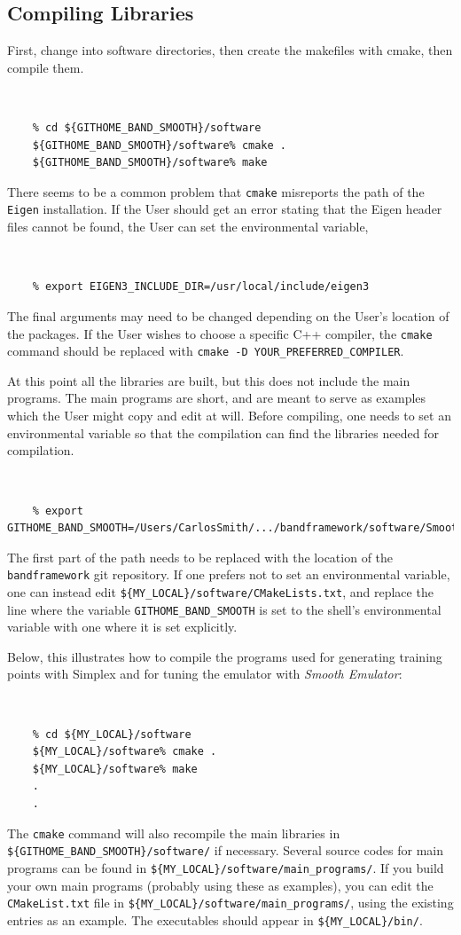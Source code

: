 \documentclass[UserManual.tex]{subfiles}
\begin{document}
\subsection{Compiling Libraries }

First, change into software directories, then create the makefiles with cmake, then compile them.
{\tt 
\begin{verbatim}
    % cd ${GITHOME_BAND_SMOOTH}/software
    ${GITHOME_BAND_SMOOTH}/software% cmake .
    ${GITHOME_BAND_SMOOTH}/software% make
\end{verbatim}
}
There seems to be a common problem that {\tt cmake} misreports the path of the {\tt Eigen} installation. If the User should get an error stating that the Eigen header files cannot be found, the User can set the environmental variable,
{\tt 
\begin{verbatim}
    % export EIGEN3_INCLUDE_DIR=/usr/local/include/eigen3
\end{verbatim}
}
The final arguments may need to be changed depending on the User's location of the packages. If the User wishes to choose a specific C++ compiler, the {\tt cmake} command should be replaced with {\tt cmake -D YOUR\_PREFERRED\_COMPILER}. 

At this point all the libraries are built, but this does not include the main programs. The main programs are short, and are meant to serve as examples which the User might copy and edit at will. Before compiling, one needs to set an environmental variable so that the compilation can find the libraries needed for compilation.
{\tt
\begin{verbatim}
    % export GITHOME_BAND_SMOOTH=/Users/CarlosSmith/.../bandframework/software/SmoothEmulator
\end{verbatim}
}
The first part of the path needs to be replaced with the location of the {\tt bandframework} git repository. If one prefers not to set an environmental variable, one can instead edit {\tt \$\{MY\_LOCAL\}/software/CMakeLists.txt}, and replace the line where the variable {\tt GITHOME\_BAND\_SMOOTH} is set to the shell's environmental variable with one where it is set explicitly.

Below, this illustrates how to compile the programs used for generating training points with Simplex and for tuning the emulator with {\it Smooth Emulator}:
{\tt
\begin{verbatim}
    % cd ${MY_LOCAL}/software
    ${MY_LOCAL}/software% cmake .
    ${MY_LOCAL}/software% make
    .
    .
\end{verbatim}
}
The {\tt cmake} command will also recompile the main libraries in {\tt \$\{GITHOME\_BAND\_SMOOTH\}/software/} if necessary. Several source codes for main programs can be found in {\tt \$\{MY\_LOCAL\}/software/main\_programs/}. If you build your own main programs (probably using these as examples), you can edit the {\tt CMakeList.txt} file in {\tt \$\{MY\_LOCAL\}/software/main\_programs/}, using the existing entries as an example. The executables should appear in {\tt \$\{MY\_LOCAL\}/bin/}. 
\end{document}
